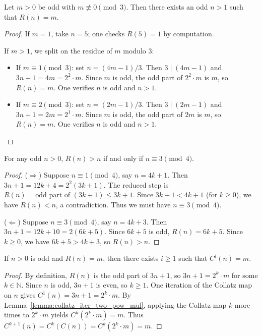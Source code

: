 \begin{lemma}\label{lemma:exists_R_with_m_not_div3}\leanok
Let $m > 0$ be odd with $m \not\equiv 0 \pmod{3}$. Then there exists an odd $n > 1$ such that $R(n) = m$.
\end{lemma}
\begin{proof}\leanok
If $m = 1$, take $n = 5$; one checks $R(5) = 1$ by computation.

If $m > 1$, we split on the residue of $m$ modulo $3$:
\begin{itemize}
\item If $m \equiv 1 \pmod{3}$: set $n = (4m - 1)/3$. Then $3 \mid (4m-1)$ and $3n + 1 = 4m = 2^2 \cdot m$. Since $m$ is odd, the odd part of $2^2 \cdot m$ is $m$, so $R(n) = m$. One verifies $n$ is odd and $n > 1$.
\item If $m \equiv 2 \pmod{3}$: set $n = (2m - 1)/3$. Then $3 \mid (2m-1)$ and $3n + 1 = 2m = 2^1 \cdot m$. Since $m$ is odd, the odd part of $2m$ is $m$, so $R(n) = m$. One verifies $n$ is odd and $n > 1$.
\end{itemize}
\end{proof}

\begin{lemma}\label{lemma:reduced_collatz_step_iff_mod4}\leanok
For any odd $n > 0$, $R(n) > n$ if and only if $n \equiv 3 \pmod{4}$.
\end{lemma}
\begin{proof}\leanok
($\Rightarrow$) Suppose $n \equiv 1 \pmod{4}$, say $n = 4k + 1$. Then $3n + 1 = 12k + 4 = 2^2(3k + 1)$. The reduced step is $R(n) = \text{odd part of } (3k + 1) \le 3k + 1$. Since $3k + 1 < 4k + 1$ (for $k \ge 0$), we have $R(n) < n$, a contradiction. Thus we must have $n \equiv 3 \pmod{4}$.

($\Leftarrow$) Suppose $n \equiv 3 \pmod{4}$, say $n = 4k + 3$. Then $3n + 1 = 12k + 10 = 2(6k + 5)$. Since $6k + 5$ is odd, $R(n) = 6k + 5$. Since $k \ge 0$, we have $6k + 5 > 4k + 3$, so $R(n) > n$.
\end{proof}

\begin{lemma}\label{lemma:reduced_collatz_step_implies_collatz_iter}\leanok
If $n > 0$ is odd and $R(n) = m$, then there exists $i \ge 1$ such that $C^i(n) = m$.
\end{lemma}
\begin{proof}\leanok
By definition, $R(n)$ is the odd part of $3n+1$, so $3n+1 = 2^k \cdot m$ for some $k \in \mathbb{N}$. Since $n$ is odd, $3n+1$ is even, so $k \ge 1$.
One iteration of the Collatz map on $n$ gives $C^1(n) = 3n+1 = 2^k \cdot m$.
By Lemma~\ref{lemma:collatz_iter_two_pow_mul}, applying the Collatz map $k$ more times to $2^k \cdot m$ yields $C^k(2^k \cdot m) = m$.
Thus $C^{k+1}(n) = C^k(C(n)) = C^k(2^k \cdot m) = m$.
\end{proof}

